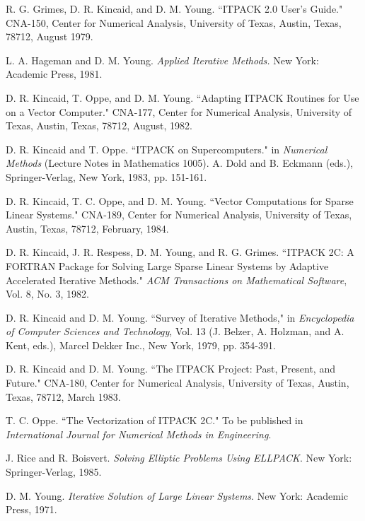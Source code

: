 \begin{thebibliography}{99}
 
  R. G. Grimes, D. R. Kincaid, and D. M. Young.  ``ITPACK 2.0
  User's Guide."  CNA-150, Center for Numerical Analysis,
  University of Texas, Austin, Texas, 78712, August 1979.

  L. A. Hageman and D. M. Young. {\em Applied Iterative 
  Methods.} New York: Academic Press, 1981.
 
  D. R. Kincaid, T. Oppe, and D. M. Young.  ``Adapting ITPACK
  Routines for Use on a Vector Computer."  CNA-177, Center
  for Numerical Analysis, University of Texas, Austin, Texas, 
  78712, August, 1982.
 
  D. R. Kincaid and T. Oppe.  ``ITPACK on Supercomputers."
  in {\em Numerical Methods} (Lecture Notes in Mathematics 1005).
  A. Dold and B. Eckmann (eds.), Springer-Verlag, New York,
  1983, pp. 151-161.
 
  D. R. Kincaid, T. C. Oppe, and D. M. Young.  ``Vector
  Computations for Sparse Linear Systems."  CNA-189, Center
  for Numerical Analysis, University of Texas, Austin, Texas, 
  78712, February, 1984.
 
  D. R. Kincaid, J. R. Respess, D. M. Young, and R. G. Grimes.
  ``ITPACK 2C: A FORTRAN Package for Solving Large Sparse
  Linear Systems by Adaptive Accelerated Iterative Methods."
  {\em ACM Transactions on Mathematical Software}, Vol. 8, 
  No. 3, 1982.
 
  D. R. Kincaid and D. M. Young. ``Survey of Iterative Methods,"
  in {\em Encyclopedia of Computer Sciences and Technology},
  Vol. 13 (J. Belzer, A. Holzman, and A. Kent, eds.), Marcel
  Dekker Inc., New York, 1979, pp. 354-391.
 
  D. R. Kincaid and D. M. Young.  ``The ITPACK Project: Past,
  Present, and Future." CNA-180, Center for Numerical Analysis,
  University of Texas, Austin, Texas, 78712, March 1983.

  T. C. Oppe.  ``The Vectorization of ITPACK 2C."  To be
  published in {\em International Journal for Numerical Methods in
  Engineering}.
 
  J. Rice and R. Boisvert. {\em Solving Elliptic
  Problems Using ELLPACK}. New York: Springer-Verlag, 1985.
 
  D. M. Young.  {\em Iterative Solution of Large Linear Systems}.
  New York: Academic Press, 1971.

\end{thebibliography}
 
